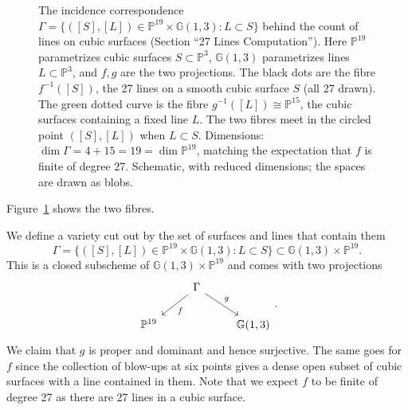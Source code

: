 \documentclass[12pt]{article}
\numberwithin{equation}{section}
\theoremstyle{definition}
\theoremstyle{remark}
\newcommand{\PP}{\mathbb{P}}
\newcommand{\GG}{\mathbb{G}}
\begin{document}
\begin{figure}[H]
\centering

\caption{The incidence correspondence $\Gamma=\{([S],[L])\in\PP^{19}\times\GG(1,3): L\subset S\}$ behind the count of lines on cubic surfaces (Section ``27 Lines Computation''). Here $\PP^{19}$ parametrizes cubic surfaces $S\subset\PP^3$, $\GG(1,3)$ parametrizes lines $L\subset\PP^3$, and $f,g$ are the two projections. The black dots are the fibre $f^{-1}([S])$, the 27 lines on a smooth cubic surface $S$ (all 27 drawn). The green dotted curve is the fibre $g^{-1}([L])\cong\PP^{15}$, the cubic surfaces containing a fixed line $L$. The two fibres meet in the circled point $([S],[L])$ when $L\subset S$. Dimensions: $\dim\Gamma=4+15=19=\dim\PP^{19}$, matching the expectation that $f$ is finite of degree 27. Schematic, with reduced dimensions; the spaces are drawn as blobs.}\label{fig:incidence-correspondence}
\end{figure}
Figure~\ref{fig:incidence-correspondence} shows the two fibres.

We define a variety cut out by the set of surfaces and lines that contain them
$$ \Gamma = \lbrace ([S],[L]) \in \PP^{19}\times \GG(1,3) \colon L \subset S \rbrace \subset \GG(1,3) \times \PP^{19}.$$
This is a closed subscheme of $\GG(1,3)\times \PP^{19}$ and comes with two projections 
$$\begin{tikzcd} 
& \Gamma \ar[dr,  "g"] \ar[dl, "f"]& \\
\PP^{19} & & \GG(1,3)  
\end{tikzcd}.$$
We claim that $g$ is proper and dominant and hence surjective. 
The same goes for $f$ since the collection of blow-ups at six points gives a dense open subset of cubic surfaces with a line contained in them.
Note that we expect $f$ to be finite of degree 27 as there are 27 lines in a cubic surface. 
\end{document}
